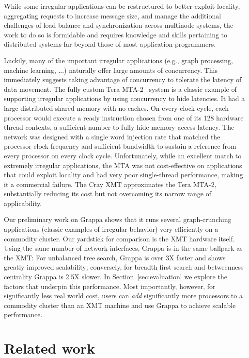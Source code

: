 While some irregular applications can be restructured to better exploit
locality, aggregating requests to increase message size, and manage the
additional challenges of load balance and synchronization across multinode
systems, the work to do so is formidable and requires knowledge and skills
pertaining to distributed systems far beyond those of most application
programmers.

Luckily, many of the important irregular applications (e.g., graph
processing, machine learning, ...) naturally offer large amounts of
concurrency. This immediately suggests taking advantage of concurrency
to tolerate the latency of data movement. The fully custom Tera
MTA-2~\cite{tera:mta1} system is a classic example of supporting irregular
applications by using concurrency to hide latencies. It had a large
distributed shared memory with no caches.  On every clock cycle, each
processor would execute a ready instruction chosen from one of its 128
hardware thread contexts, a sufficient number to fully hide memory
access latency.  The network was designed with a single word injection
rate that matched the processor clock frequency and sufficient bandwidth
to sustain a reference from every processor on every clock cycle.
Unfortunately, while an excellent match to extremely irregular
applications, the MTA was not cost-effective on applications that could
exploit locality and had very poor single-thread performance, making
it a commercial failure. The Cray XMT approximates the Tera MTA-2,
substantially reducing its cost but not overcoming its narrow range of
applicability.

Our preliminary work on Grappa shows that it runs several graph-crunching
applications (classic examples of irregular behavior) very efficiently
on a commodity cluster. Our yardstick for comparison is the XMT hardware
itself. Using the same number of network interfaces, Grappa is in the
same ballpark as the XMT: For unbalanced tree search, Grappa is over 3X
faster and shows greatly improved scalability; conversely, for breadth
first search and betweenness centrality Grappa is 2.5X slower.  In
Section~\ref{sec:evaluation} we explore the factors that underpin this
performance. Most importantly, however, for significantly less real
world cost, users can \emph{add\/} significantly more processors to a
commodity cluster than an XMT machine and use Grappa to achieve scalable
performance.

\section{Related work}

